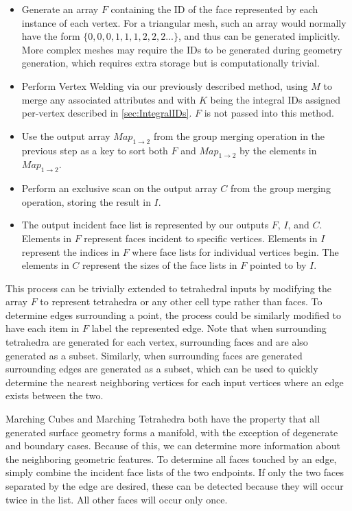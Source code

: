 \documentclass[journal]{vgtc}                %
\begin{document}
\begin{itemize}
\item{Generate an array $F$ containing the ID of the face represented by each instance of each vertex. For a triangular mesh, such an array would normally have the form  $\lbrace0,0,0,1,1,1,2,2,2...\rbrace$, and thus can be generated implicitly. More complex meshes may require the IDs to be generated during geometry generation, which requires extra storage but is computationally trivial.}
\item{Perform Vertex Welding via our previously described method, using $M$ to merge any associated attributes and with $K$ being the integral IDs assigned per-vertex described in \ref{sec:IntegralIDs}. $F$ is not passed into this method.}
\item{Use the output array $Map_{1\rightarrow 2}$ from the group merging operation in the previous step as a key to sort both $F$ and $Map_{1\rightarrow 2}$ by the elements in $Map_{1\rightarrow 2}$. }
\item{Perform an exclusive scan on the output array $C$ from the group merging operation, storing the result in $I$.}
\item{The output incident face list is represented by our outputs $F$, $I$, and $C$. Elements in $F$ represent faces incident to specific vertices. Elements in $I$ represent the indices in $F$ where face lists for individual vertices begin. The elements in $C$ represent the sizes of the face lists in $F$ pointed to by $I$.}
\end{itemize}

This process can be trivially extended to tetrahedral inputs by modifying the array $F$ to represent tetrahedra or any other cell type rather than faces. To determine edges surrounding a point, the process could be similarly modified to have each item in $F$ label the represented edge. Note that when surrounding tetrahedra are generated for each vertex, surrounding faces and  are also generated as a subset. Similarly, when surrounding faces are generated surrounding edges are generated as a subset, which can be used to quickly determine the nearest neighboring vertices for each input vertices where an edge exists between the two.

Marching Cubes and Marching Tetrahedra both have the property that all generated surface geometry forms a manifold, with the exception of degenerate and boundary cases. Because of this, we can determine more information about the neighboring geometric features. To determine all faces touched by an edge, simply combine the incident face lists of the two endpoints. If only the two faces separated by the edge are desired, these can be detected because they will occur twice in the list. All other faces will occur only once. 
\end{document}
